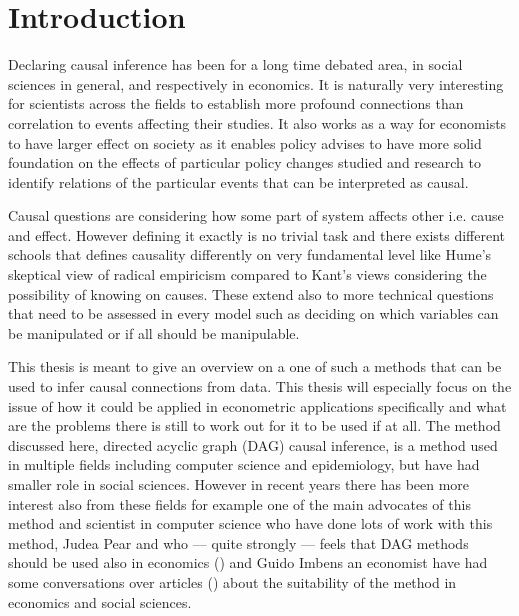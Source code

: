 \documentclass[main=english,12pt,a4paper,pdftex,econ,utf8]{aaltothesis}
\begin{document}
\section{Introduction}

\thispagestyle{empty}

Declaring causal inference has been for a long time debated area, in social sciences in general, and respectively in economics. It is naturally very interesting for scientists across the fields to establish more profound connections than correlation to events affecting their studies. It also works as a way for economists to have larger effect on society as it enables policy advises to have more solid foundation on the effects of particular policy changes studied and research to identify relations of the particular events that can be interpreted as causal.

Causal questions are considering how some part of system affects other i.e. cause and effect. However defining it exactly is no trivial task and there exists different schools that defines causality differently on very fundamental level like Hume's skeptical view of radical empiricism compared to Kant's views considering the possibility of knowing on causes. These extend also to more technical questions that need to be assessed in every model such as deciding on which variables can be manipulated or if all should be manipulable.

This thesis is meant to give an overview on a one of such a methods that can be used to infer causal connections from data. This thesis will especially focus on the issue of how it could be applied in econometric applications specifically and what are the problems there is still to work out for it to be used if at all. The method discussed here, directed acyclic graph (DAG) causal inference, is a method used in multiple fields including computer science and epidemiology, but have had smaller role in social sciences. However in recent years there has been more interest also from these fields for example one of the main advocates of this method and scientist in computer science who have done lots of work with this method, Judea Pear and who --- quite strongly --- feels that DAG methods should be used also in economics (\cite{pearl_2014}) and Guido Imbens an economist have had some conversations over articles (\cite{Imbens2014}) about the suitability of the method in economics and social sciences.
\end{document}
